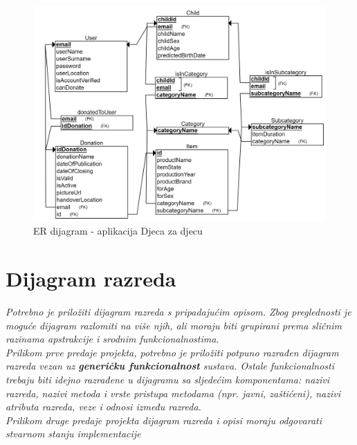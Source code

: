 				\begin{figure}[H]
					\includegraphics[width=\textwidth,height=0.7\textheight]{dijagrami/RelDijagram.png}
					\centering
					\caption{ER dijagram - aplikacija Djeca za djecu}
					\label{fig:RelDijagram}
				\end{figure}
			\eject
			
			
		\section{Dijagram razreda}
		
			\textit{Potrebno je priložiti dijagram razreda s pripadajućim opisom. Zbog preglednosti je moguće dijagram razlomiti na više njih, ali moraju biti grupirani prema sličnim razinama apstrakcije i srodnim funkcionalnostima.}\\
			
			
			\textit{Prilikom prve predaje projekta, potrebno je priložiti potpuno razrađen dijagram razreda vezan uz \textbf{generičku funkcionalnost} sustava. Ostale funkcionalnosti trebaju biti idejno razrađene u dijagramu sa sljedećim komponentama: nazivi razreda, nazivi metoda i vrste pristupa metodama (npr. javni, zaštićeni), nazivi atributa razreda, veze i odnosi između razreda.}\\
			
			
			\textit{Prilikom druge predaje projekta dijagram razreda i opisi moraju odgovarati stvarnom stanju implementacije}
			
